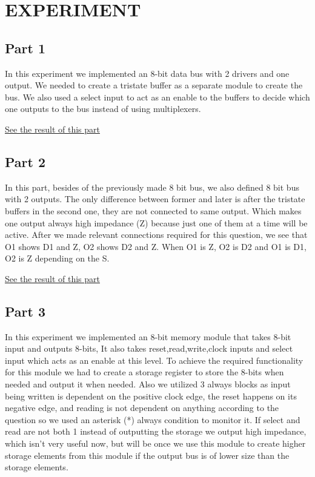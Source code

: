 \documentclass[pdftex,12pt,a4paper]{article}
\begin{document}
\section{EXPERIMENT}
\subsection{Part 1}
In this experiment we implemented an 8-bit data bus with 2 drivers and one output. We needed to create a tristate buffer as a separate module to create the bus. We also used a select input to act as an enable to the buffers to decide which one outputs to the bus instead of using multiplexers.

\hyperlink{hype1}{See the result of this part}

\subsection{Part 2}

In this part, besides of the previously made 8 bit bus, we also defined 8 bit bus with 2 outputs. The only difference between former and later is after the tristate buffers in the second one, they are not connected to same output. Which makes one output always high impedance (Z) because just one of them at a time will be active. After we made relevant connections required for this question, we see that O1 shows D1 and Z, O2 shows D2 and Z. When O1 is Z, O2 is D2 and O1 is D1, O2 is Z depending on the S.

\hyperlink{hype2}{See the result of this part}


\subsection{Part 3}
In this experiment we implemented an 8-bit memory module that takes 8-bit input and outputs 8-bits, It also takes reset,read,write,clock inputs and select input which acts as an enable at this level. To achieve the required functionality for this module we had to create a storage register to store the 8-bits when needed and output it when needed. Also we utilized 3 always blocks as input being written is dependent on the positive clock edge, the reset happens on its negative edge, and reading is not dependent on anything according to the question so we used an asterisk (*) always condition to monitor it. If select and read are not both 1 instead of outputting the storage we output high impedance, which isn't very useful now, but will be once we use this module to create higher storage elements from this module if the output bus is of lower size than the storage elements.
\end{document}
